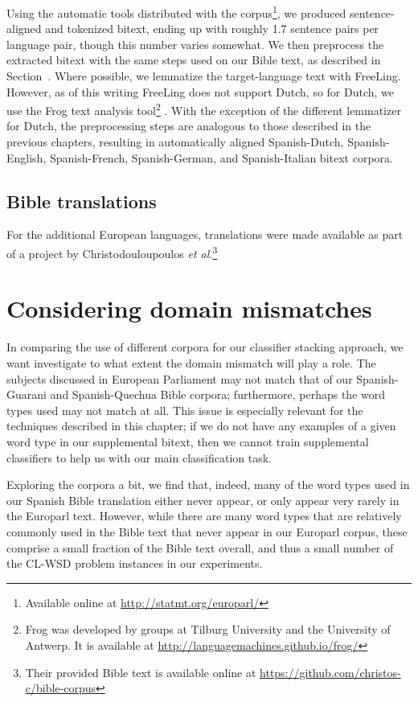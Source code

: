 Using the automatic tools distributed with the corpus\footnote{Available
online at \url{http://statmt.org/europarl/}}, we produced sentence-aligned
and tokenized bitext, ending up with roughly 1.7 sentence pairs per language
pair, though this number varies somewhat.
We then preprocess the extracted bitext with the same steps used on our Bible
text, as described in Section~\label{sec:datasetsandpreprocessing}. Where
possible, we lemmatize the target-language text with FreeLing. However, as of
this writing FreeLing does not support Dutch, so for Dutch, we use the Frog
text analysis tool\footnote{Frog was developed by groups at Tilburg University
and the University of Antwerp. It is available at
\url{http://languagemachines.github.io/frog/}} \cite{tadpole2007}. With the
exception of the different lemmatizer for Dutch, the preprocessing steps are
analogous to those described in the previous chapters, resulting in
automatically aligned Spanish-Dutch, Spanish-English, Spanish-French,
Spanish-German, and Spanish-Italian bitext corpora.

\subsection{Bible translations}

For the additional European languages, translations were made available as part
of a project by Christodouloupoulos \emph{et
al.}\cite{Christodouloupoulos2015}\footnote{Their provided Bible text is
available online at \url{https://github.com/christos-c/bible-corpus}}


\section{Considering domain mismatches}
In comparing the use of different corpora for our classifier stacking approach,
we want investigate to what extent the domain mismatch will play a role.
The subjects discussed in European Parliament may not match that of our
Spanish-Guarani and Spanish-Quechua Bible corpora; furthermore, perhaps the
word types used may not match at all. This issue is especially relevant for the
techniques described in this chapter; if we do not have any examples of a given
word type in our supplemental bitext, then we cannot train supplemental
classifiers to help us with our main classification task.


Exploring the corpora a bit, we find that, indeed, many of the word types used
in our Spanish Bible translation either never appear, or only appear very
rarely in the Europarl text. However, while there are many word types that are
relatively commonly used in the Bible text that never appear in our Europarl
corpus, these comprise a small fraction of the Bible text overall, and thus a
small number of the CL-WSD problem instances in our experiments.

